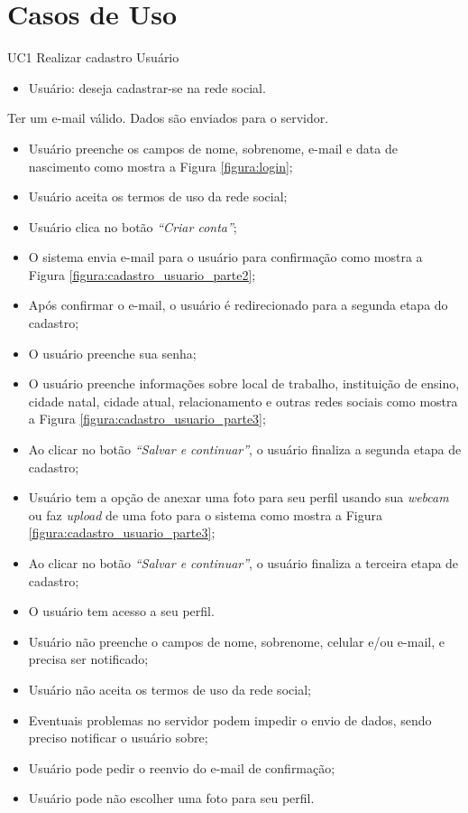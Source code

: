\chapter{Casos de Uso}

\casoDeUso
{UC1}
{Realizar cadastro}
{Usuário}
{
\begin{itemize}
	\item Usuário: deseja cadastrar-se na rede social.	
\end{itemize}

}
{Ter um e-mail válido.}
{Dados são enviados para o servidor.}
{
\begin{itemize}
	\item Usuário preenche os campos de nome, sobrenome, e-mail e data de nascimento como mostra a Figura  \ref{figura:login}; %
	\item Usuário aceita os termos de uso da rede social;		
	\item Usuário clica no botão \textit{“Criar conta”};	
	\item O sistema envia e-mail para o usuário para confirmação como mostra a Figura \ref{figura:cadastro_usuario_parte2};
	\item Após confirmar o e-mail, o usuário é redirecionado para a segunda etapa do cadastro;		
	\item O usuário preenche sua senha;
	\item O usuário preenche informações sobre local de trabalho, instituição de ensino, cidade natal, cidade atual, relacionamento e outras redes sociais como mostra a Figura \ref{figura:cadastro_usuario_parte3};
	\item Ao clicar no botão \textit{“Salvar e continuar”}, o usuário finaliza a segunda etapa de cadastro;	
	\item Usuário tem a opção de anexar uma foto para seu perfil usando sua \textit{webcam} ou faz \textit{upload} de uma foto para o sistema como mostra a Figura \ref{figura:cadastro_usuario_parte3}; %
	\item Ao clicar no botão \textit{“Salvar e continuar”}, o usuário finaliza a terceira etapa de cadastro;
	\item O usuário tem acesso a seu perfil.	
	
			
\end{itemize}
}
{
\begin{itemize}
	\item Usuário não preenche o campos de nome, sobrenome, celular e/ou e-mail, e precisa ser notificado;
	\item Usuário não aceita os termos de uso da rede social;
	\item Eventuais problemas no servidor podem impedir o envio de dados, sendo preciso notificar o usuário sobre;
	\item Usuário pode pedir o reenvio do e-mail de confirmação;
	\item Usuário pode não escolher uma foto para seu perfil.
	
\end{itemize}
}
